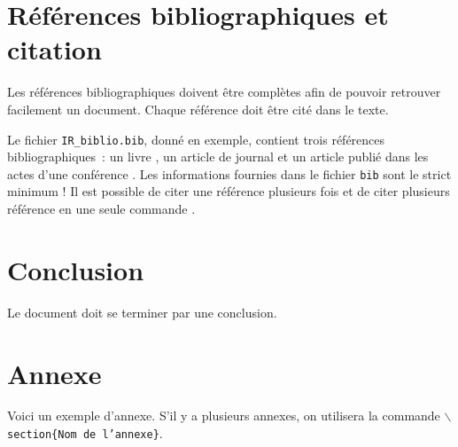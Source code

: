 \documentclass{ir}
\begin{document}
\section{Références bibliographiques et citation}\label{sec:biblio}

Les références bibliographiques doivent être complètes afin de pouvoir retrouver facilement un document. Chaque référence doit être cité dans le texte.

Le fichier \texttt{IR\_biblio.bib}, donné en exemple, contient trois références bibliographiques~: un livre \cite{goldberg89genetic}, un article de journal \cite{koza92genetic} et un article publié dans les actes d'une conférence \cite{macqueen65some}. Les informations fournies dans le fichier \texttt{bib} sont le strict minimum ! Il est possible de citer une référence plusieurs fois et de citer plusieurs référence en une seule commande \cite{goldberg89genetic,koza92genetic}.

\section{Conclusion}

Le document doit se terminer par une conclusion.





\appendix

\section*{Annexe}

Voici un exemple d'annexe. S'il y a plusieurs annexes, on utilisera la commande \texttt{$\backslash$section\{Nom de l'annexe\}}.
\end{document}
